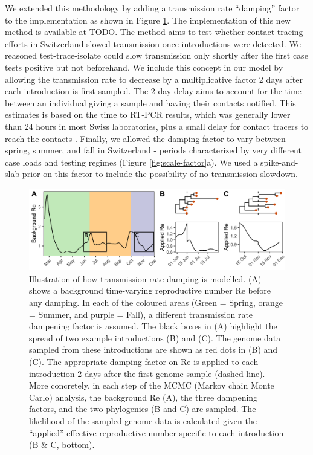 \documentclass[11pt,twoside,lineno]{pnas-new} %
\begin{document}
We extended this methodology by adding a transmission rate ``damping'' factor to the implementation as shown in Figure \ref{fig:phylo-methods}. The implementation of this new method is available at TODO. The method aims to test whether contact tracing efforts in Switzerland slowed transmission once introductions were detected. We reasoned test-trace-isolate could slow transmission only shortly after the first case tests positive but not beforehand. We include this concept in our model by allowing the transmission rate to decrease by a multiplicative factor 2 days after each introduction is first sampled. The 2-day delay aims to account for the time between an individual giving a sample and having their contacts notified. This estimates is based on the time to RT-PCR results, which was generally lower than 24 hours in most Swiss laboratories, plus a small delay for contact tracers to reach the contacts \cite{Marquis2021}. Finally, we allowed the damping factor to vary between spring, summer, and fall in Switzerland - periods characterized by very different case loads and testing regimes (Figure \ref{fig:scale-factor}a). We used a spike-and-slab prior on this factor to include the possibility of no transmission slowdown. 

\begin{figure}[h!]
\centering
\includegraphics[width=0.75\linewidth]{figures/phylodynamic_method_example.png}
\caption{Illustration of how transmission rate damping is modelled. (A) shows a background time-varying reproductive number Re before any damping. In each of the coloured areas (Green = Spring, orange = Summer, and purple = Fall), a different transmission rate dampening factor is assumed. The black boxes in (A) highlight the spread of two example introductions (B) and (C). The genome data sampled from these introductions are shown as red dots in (B) and (C). The appropriate damping factor on Re is applied to each introduction 2 days after the first genome sample (dashed line). More concretely, in each step of the MCMC (Markov chain Monte Carlo) analysis, the background Re (A), the three dampening factors, and the two phylogenies (B and C) are sampled. The likelihood of the sampled genome data is calculated given the ``applied'' effective reproductive number specific to each introduction (B \& C, bottom).}  
\label{fig:phylo-methods}
\end{figure}
\end{document}
